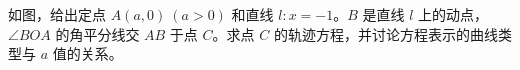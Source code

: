 \begin{question}
如图，给出定点 $A(a,0)\ (a>0)$ 和直线 $l:x=-1$。$B$ 是直线 $l$ 上的动点，$\angle BOA$ 的角平分线交 $AB$ 于点 $C$。求点 $C$ 的轨迹方程，并讨论方程表示的曲线类型与 $a$ 值的关系。
\nopagebreak[4]
\begin{center}\end{center}
\nopagebreak[4]

\end{question}
